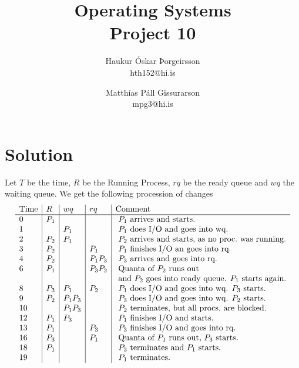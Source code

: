 \documentclass[a4]{article}
\title{Operating Systems\\
    Project 10}
\author{
        Haukur Óskar Þorgeirsson\\
        hth152@hi.is \and
        Matthías Páll Gissurarson\\
        mpg3@hi.is
    }
\begin{document}
    \maketitle

    \section{Solution}
    Let $T$ be the time, $R$ be the Running Process, $rq$ be the ready queue and $wq$
    the waiting queue. We get the following procession of changes
    $$
    \begin{array}{l | l | l | l| l}
      \text{Time} & R & wq & rq & \text{Comment} \\
      \hline
      0  &  P_1 &         &         & \text{ $P_1$ arrives and starts.}\\
      1  &      & P_1     &         &\text{ $P_1$ does I/O and goes into wq. }\\
      2  &  P_2 & P_1     &         & \text{ $P_2$ arrives and starts, as no proc.\ was running.}\\

      3  &  P_2 &         & P_1     &\text{ $P_1$ finishes I/O an goes into rq.}\\
      4  &  P_2 &         & P_1 P_3 &\text{ $P_3$ arrives and goes into rq. }\\ 
      6  &  P_1 &         & P_3 P_2 & \text{ Quanta of $P_2$ runs out}\\
         &      &         &         &\text{ and $P_2$ goes into ready queue. $P_1$ starts again.}\\

      8  &  P_3 & P_1     & P_2     & \text{ $P_1$ does I/O and goes into wq. $P_3$ starts.}\\
      9  &  P_2 & P_1 P_3 &         & \text{ $P_3$ does I/O and goes into wq. $P_2$ starts.}\\
      10 &      & P_1 P_3 &         & \text{ $P_2$ terminates, but all procs.\ are blocked.}\\
      12 &  P_1 & P_3     &         & \text{ $P_1$ finishes I/O and starts.}\\
      13 &  P_1 &         & P_3     & \text{ $P_3$ finishes I/O and goes into rq.}\\
      16 &  P_3 &         & P_1     & \text{ Quanta of $P_1$ runs out, $P_3$ starts.} \\
      18 &  P_1 &         &         & \text{ $P_3$ terminates and $P_1$ starts.}\\
      19 &      &         &         & \text{ $P_1$ terminates.}
    \end{array}
    $$
\end{document}
